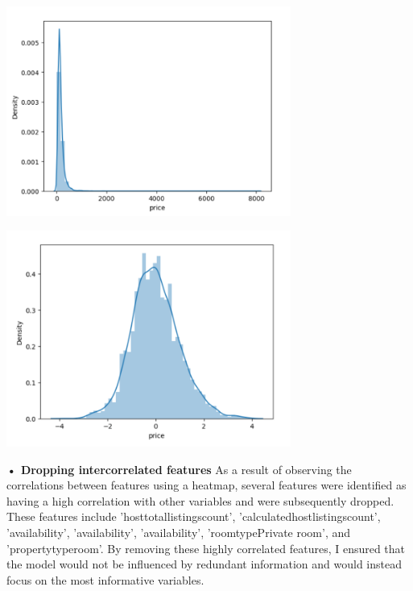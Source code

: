 \documentclass{article}
\begin{document}
\begin{center}
    \includegraphics[width=0.7\textwidth,height=0.4\textheight]{price_before.png}
    \captionsetup{justification=centering}
\end{center}
\begin{center}
    \includegraphics[width=0.7\textwidth,height=0.4\textheight]{price_after.png}
    \captionsetup{justification=centering}
\end{center}
\vspace{.5cm}
\textbf{• Dropping intercorrelated features}
As a result of observing the correlations between features using a heatmap, several features were identified as having a high correlation with other variables and were subsequently dropped. These features include 'host\textunderscore total\textunderscore listings\textunderscore count', 'calculated\textunderscore host\textunderscore listings\textunderscore count', 'availability', 'availability', 'availability', 'room\textunderscore type\textunderscore Private room', and 'property\textunderscore type\textunderscore room'. By removing these highly correlated features, I ensured that the model would not be influenced by redundant information and would instead focus on the most informative variables.\\
\end{document}
